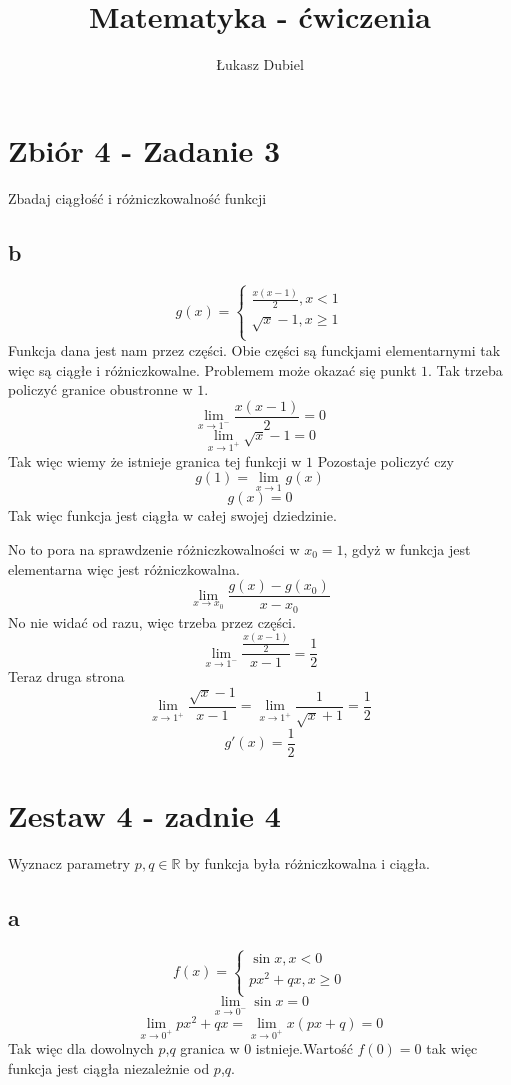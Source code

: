 \documentclass{article}
\title{Matematyka - ćwiczenia}
\author{Łukasz Dubiel}
\begin{document}
\maketitle

\section{Zbiór 4 - Zadanie 3}
Zbadaj ciągłość i różniczkowalność funkcji
\subsection{b}
\begin{displaymath}g(x) =
\begin{cases}
\frac{x(x-1)}{2} , x < 1 \\
\sqrt{x} - 1 , x \geq 1 \\
\end{cases}
\end{displaymath}
Funkcja dana jest nam przez części. Obie części są funckjami elementarnymi tak więc są ciągłe i różniczkowalne.
Problemem może okazać się punkt $1$. Tak trzeba policzyć granice obustronne w $1$.
$$\lim_{x \to 1^-}{\frac{x(x-1)}{2}} = 0 $$
$$\lim_{x \to 1^+}{\sqrt{x} - 1} = 0$$
Tak więc wiemy że istnieje granica tej funkcji w $1$
Pozostaje policzyć czy $$ g(1) = \lim_{x \to 1}{g(x)} $$
$$g(x) = 0 $$
Tak więc funkcja jest ciągła w całej swojej dziedzinie.

No to pora na sprawdzenie różniczkowalności w $x_0 = 1$, gdyż w funkcja jest elementarna więc jest różniczkowalna.
$$\lim_{x \to x_0}{\frac{g(x) - g(x_0)}{x - x_0}} $$
No nie widać od razu, więc trzeba przez części.
$$\lim_{x \to 1^-}{\frac{\frac{x(x-1)}{2}}{x-1}} = \frac{1}{2}$$
Teraz druga strona
$$\lim_{x \to 1^+}{\frac{\sqrt{x}-1}{x - 1}} = \lim_{ x \to 1^+}{\frac{1}{\sqrt{x}+1}} = \frac{1}{2} $$
$$g'(x) = \frac{1}{2}$$

\newpage
\section{Zestaw 4 - zadnie 4}
Wyznacz parametry $ p , q \in \mathbb{R} $ by funkcja była różniczkowalna i ciągła.
\subsection{a}
$$f(x) =
\begin{cases}
\sin{x}, x < 0 \\
px^2 + qx , x \geq 0\\
\end{cases}$$
$$\lim_{x \to 0^-}{\sin{x}} = 0$$
$$\lim_{x \to 0^+}{px^2 + qx} = \lim_{x \to 0^+}{x(px + q)} = 0 $$
Tak więc dla dowolnych $p$,$q$ granica w $0$ istnieje.Wartość $f(0) = 0 $ tak więc funkcja jest ciągła niezależnie od $p$,$q$.
\end{document}
